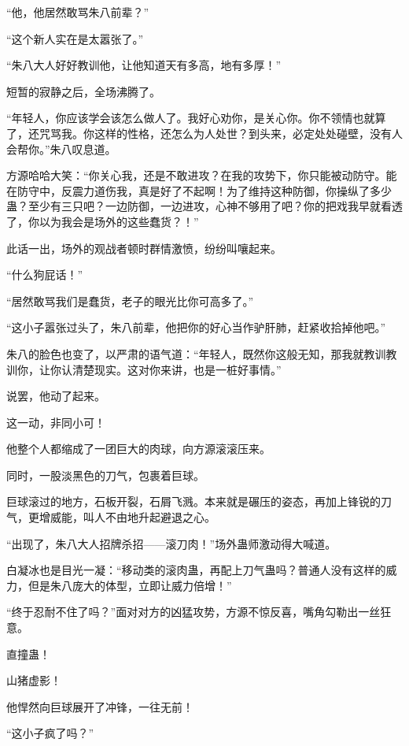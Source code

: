 
\begin{this_body}

“他，他居然敢骂朱八前辈？”

“这个新人实在是太嚣张了。”

“朱八大人好好教训他，让他知道天有多高，地有多厚！”

短暂的寂静之后，全场沸腾了。

“年轻人，你应该学会该怎么做人了。我好心劝你，是关心你。你不领情也就算了，还咒骂我。你这样的性格，还怎么为人处世？到头来，必定处处碰壁，没有人会帮你。”朱八叹息道。

方源哈哈大笑：“你关心我，还是不敢进攻？在我的攻势下，你只能被动防守。能在防守中，反震力道伤我，真是好了不起啊！为了维持这种防御，你操纵了多少蛊？至少有三只吧？一边防御，一边进攻，心神不够用了吧？你的把戏我早就看透了，你以为我会是场外的这些蠢货？！”

此话一出，场外的观战者顿时群情激愤，纷纷叫嚷起来。

“什么狗屁话！”

“居然敢骂我们是蠢货，老子的眼光比你可高多了。”

“这小子嚣张过头了，朱八前辈，他把你的好心当作驴肝肺，赶紧收拾掉他吧。”

朱八的脸色也变了，以严肃的语气道：“年轻人，既然你这般无知，那我就教训教训你，让你认清楚现实。这对你来讲，也是一桩好事情。”

说罢，他动了起来。

这一动，非同小可！

他整个人都缩成了一团巨大的肉球，向方源滚滚压来。

同时，一股淡黑色的刀气，包裹着巨球。

巨球滚过的地方，石板开裂，石屑飞溅。本来就是碾压的姿态，再加上锋锐的刀气，更增威能，叫人不由地升起避退之心。

“出现了，朱八大人招牌杀招——滚刀肉！”场外蛊师激动得大喊道。

白凝冰也是目光一凝：“移动类的滚肉蛊，再配上刀气蛊吗？普通人没有这样的威力，但是朱八庞大的体型，立即让威力倍增！”

“终于忍耐不住了吗？”面对对方的凶猛攻势，方源不惊反喜，嘴角勾勒出一丝狂意。

直撞蛊！

山猪虚影！

他悍然向巨球展开了冲锋，一往无前！

“这小子疯了吗？”


\end{this_body}
